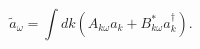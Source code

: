 \begin{equation}
\tilde a_{\omega }=\int dk (A_{k\omega }a_k+ B^*_{k\omega }a^\dagger_k).
\end{equation}

